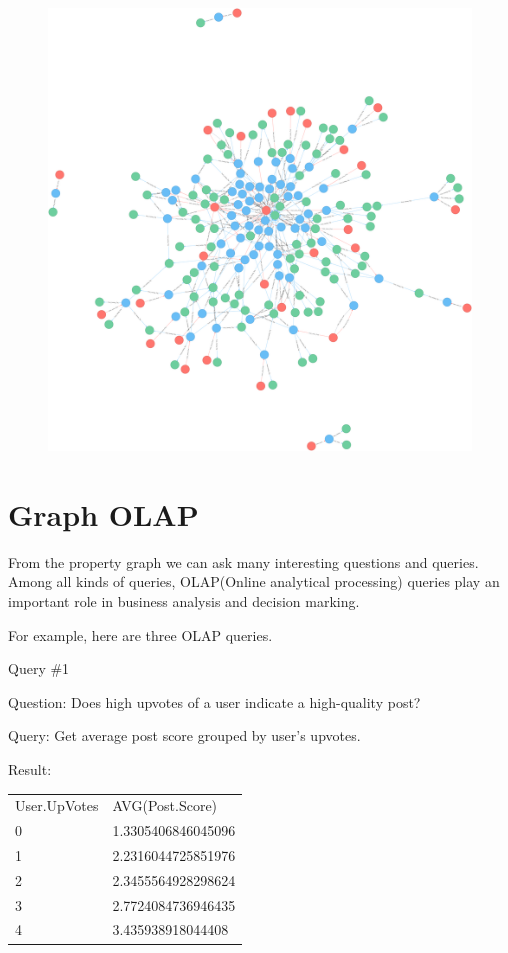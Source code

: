 \begin {figure}[H]
\centering
\includegraphics[scale=0.1]{pic/3.png}
\end{figure}

\section{Graph OLAP}

From the property graph we can ask many interesting questions and queries. Among all kinds of queries, OLAP(Online analytical processing) queries play an important role in business analysis and decision marking. 
 
For example, here are three OLAP queries.
 
Query \#1

Question: 	Does high upvotes of a user indicate a high-quality post?
 
Query: 		Get average post score grouped by user’s upvotes. 

Result:
\begin {center}
 \begin{tabular}{ l l }  
User.UpVotes&AVG(Post.Score)\\0&1.3305406846045096\\1&2.2316044725851976\\2&2.3455564928298624\\3&2.7724084736946435\\4&3.435938918044408\\
 \end{tabular}
 \end {center}

